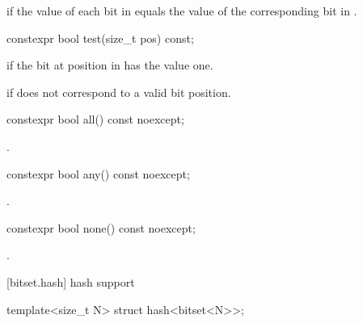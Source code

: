 \begin{itemdescr}
\pnum
\returns
{} if the value of each bit in
equals the value of the corresponding bit in .
\end{itemdescr}

%
\begin{itemdecl}
constexpr bool test(size_t pos) const;
\end{itemdecl}

\begin{itemdescr}
\pnum
\returns
{}
if the bit at position 
in
has the value one.

\pnum
\throws
{}%
 if  does not correspond to a valid bit position.
\end{itemdescr}

%
\begin{itemdecl}
constexpr bool all() const noexcept;
\end{itemdecl}

\begin{itemdescr}
\pnum
\returns
{}.
\end{itemdescr}

%
%
\begin{itemdecl}
constexpr bool any() const noexcept;
\end{itemdecl}

\begin{itemdescr}
\pnum
\returns
{}.
\end{itemdescr}

%
\begin{itemdecl}
constexpr bool none() const noexcept;
\end{itemdecl}

\begin{itemdescr}
\pnum
\returns
{}.
\end{itemdescr}

[bitset.hash]{ hash support}

%
\begin{itemdecl}
template<size_t N> struct hash<bitset<N>>;
\end{itemdecl}

